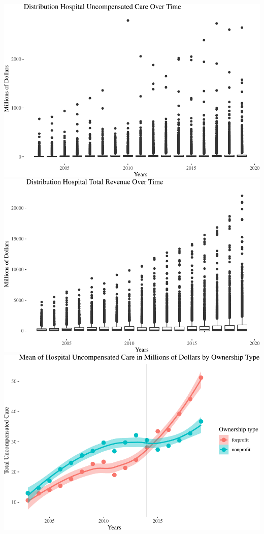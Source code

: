 \documentclass[
  12pt,
]{article}
\begin{document}
\includegraphics{Report_files/figure-latex/Figures-1.pdf}
\includegraphics{Report_files/figure-latex/Figures-2.pdf}
\includegraphics{Report_files/figure-latex/Figures-3.pdf}
\end{document}
